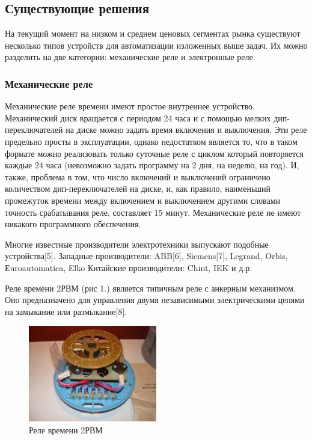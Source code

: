 \subsection{Существующие решения}
На текущий момент на низком и среднем ценовых сегментах рынка существуют несколько типов устройств для автоматизации изложенных выше задач. Их можно разделить на две категории: механические реле и электронные реле.

\subsubsection{Механические реле}
Механические реле времени имеют простое внутреннее устройство. Механический диск вращается с периодом 24 часа и с помощью мелких дип-переключателей на диске можно задать время включения и выключения. Эти реле предельно просты в эксплуатации, однако недостатком является то, что в таком формате можно реализовать только суточные реле с циклом который повторяется каждые 24 часа (невозможно задать программу на 2 дня, на неделю, на год). И, также, проблема в том, что число включений и выключений ограничено количеством дип-переключателей на диске, и, как правило, наименьший промежуток времени между включением и выключением другими словами точность срабатывания реле, составляет 15 минут. Механические реле не имеют никакого программного обеспечения.

Многие известные производители электротехники выпускают подобные устройства[5]. 
Западные производители: ABB[6], Siemens[7], Legrand, Orbis, Еuroautomatica, Elko
Китайские производители: Chint, IEK и д.р.

Реле времени 2РВМ (рис 1.) является типичным реле с анкерным механизмом. Оно предназначено для управления двумя независимыми электрическими цепями на замыкание или размыкание[8].

\begin{figure}[h!]
    \centering
    \includegraphics[width=0.5\textwidth]{mechanical_rele.png}
    \caption{Реле времени 2РВМ}
\end{figure}


